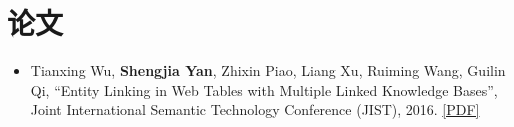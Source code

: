 \section{论文}
\begin{itemize}
  \item Tianxing Wu, \textbf{Shengjia Yan}, Zhixin Piao, Liang Xu, Ruiming Wang, Guilin Qi, ``Entity Linking in Web Tables with Multiple Linked Knowledge Bases'', Joint International Semantic Technology Conference (JIST), 2016. \href{http://yanshengjia.com/file/jist2016.pdf}{[PDF]}
\end{itemize}